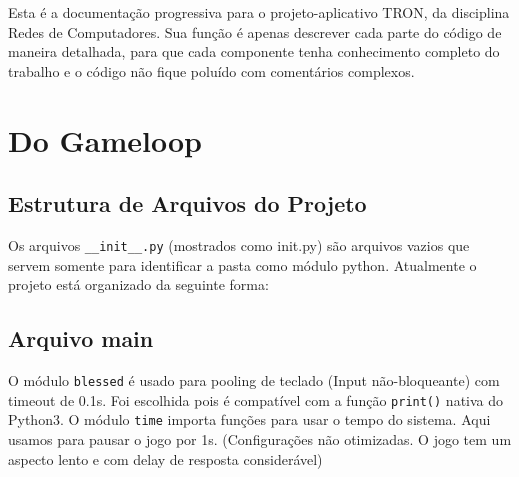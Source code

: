 \documentclass{cisXXX} %
\begin{document}
    \maketitle

    Esta é a documentação progressiva para o projeto-aplicativo TRON, da disciplina Redes de Computadores. Sua função é apenas descrever cada parte do código de maneira detalhada, para que cada componente tenha conhecimento completo do trabalho e o código não fique poluído com comentários complexos.

    \section{Do Gameloop}
    \subsection{Estrutura de Arquivos do Projeto}
    Os arquivos \verb|__init__.py| (mostrados como init.py) são arquivos vazios que servem somente para identificar a pasta como módulo python. Atualmente o projeto está organizado da seguinte forma:
    
    \begin{center}
    \begin{minipage}{0.7\textwidth}
    \end{minipage}
    \end{center}

    \subsection{Arquivo main}
            O módulo \texttt{blessed} é usado para pooling de teclado (Input não-bloqueante) com  timeout de 0.1s. Foi escolhida pois é compatível com a função \texttt{print()} nativa do Python3. O módulo \texttt{time} importa funções para usar o tempo do sistema. Aqui usamos para pausar o jogo por 1s. (Configurações não otimizadas. O jogo tem um aspecto lento e com delay de resposta considerável)
\end{document}
